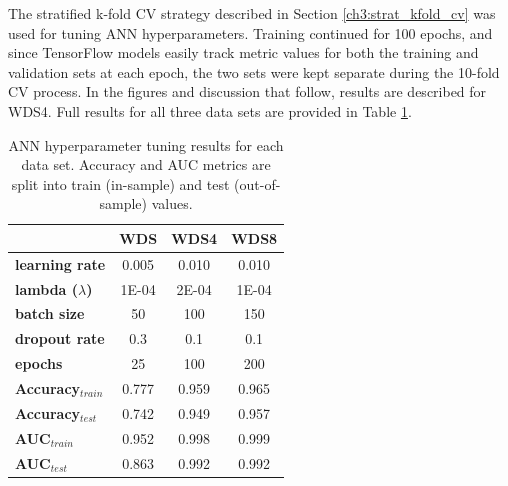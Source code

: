 The stratified k-fold CV strategy described in Section \ref{ch3:strat_kfold_cv} was used for tuning ANN hyperparameters. Training continued for 100 epochs, and since TensorFlow models easily track metric values for both the training and validation sets at each epoch, the two sets were kept separate during the 10-fold CV process. In the figures and discussion that follow, results are described for WDS4. Full results for all three data sets are provided in Table \ref{tab:nn_tuning}. 

\begin{table}[htp]
\centering
\begin{tabular}{l|c|c|c|}
\cline{2-4}
                                      & \textbf{WDS}   & \textbf{WDS4}  & \textbf{WDS8}  \\ \hline
\multicolumn{1}{|l|}{\textbf{learning rate}}   & 0.005 & 0.010 & 0.010 \\ \hline
\multicolumn{1}{|l|}{\textbf{lambda ($\lambda$)}}          & 1E-04 & 2E-04 & 1E-04 \\ \hline
\multicolumn{1}{|l|}{\textbf{batch size}}      & 50    & 100   & 150   \\ \hline
\multicolumn{1}{|l|}{\textbf{dropout rate}}    & 0.3   & 0.1   & 0.1   \\ \hline
\multicolumn{1}{|l|}{\textbf{epochs}}          & 25    & 100   & 200   \\ \hline
\multicolumn{1}{|l|}{\textbf{Accuracy$_{train}$}} & 0.777 & 0.959 & 0.965 \\ \hline
\multicolumn{1}{|l|}{\textbf{Accuracy$_{test}$}}  & 0.742 & 0.949 & 0.957 \\ \hline
\multicolumn{1}{|l|}{\textbf{AUC$_{train}$}}      & 0.952 & 0.998 & 0.999 \\ \hline
\multicolumn{1}{|l|}{\textbf{AUC$_{test}$}}       & 0.863 & 0.992 & 0.992 \\ \hline
\end{tabular}
\singlespacing
\caption[Neural network hyperparameter tuning results]{ANN hyperparameter tuning results for each data set. Accuracy and AUC metrics are split into train (in-sample) and test (out-of-sample) values.}
\label{tab:nn_tuning}
\end{table}

